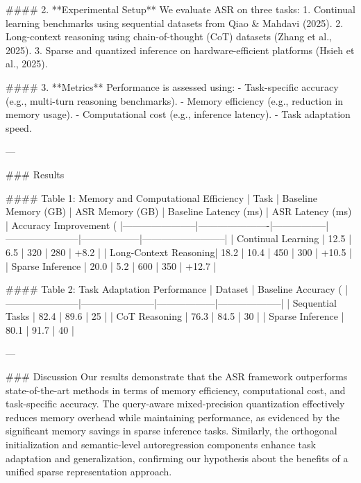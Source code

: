 #### 2. **Experimental Setup**  
We evaluate ASR on three tasks:  
1. Continual learning benchmarks using sequential datasets from Qiao & Mahdavi (2025).  
2. Long-context reasoning using chain-of-thought (CoT) datasets (Zhang et al., 2025).  
3. Sparse and quantized inference on hardware-efficient platforms (Hsieh et al., 2025).

#### 3. **Metrics**  
Performance is assessed using:  
- Task-specific accuracy (e.g., multi-turn reasoning benchmarks).  
- Memory efficiency (e.g., reduction in memory usage).  
- Computational cost (e.g., inference latency).  
- Task adaptation speed.

---

### Results  

#### Table 1: Memory and Computational Efficiency  
| Task                  | Baseline Memory (GB) | ASR Memory (GB) | Baseline Latency (ms) | ASR Latency (ms) | Accuracy Improvement (%
|-----------------------|----------------------|-----------------|-----------------------|------------------|--------------------------|
| Continual Learning    | 12.5                | 6.5             | 320                   | 280              | +8.2                    |
| Long-Context Reasoning| 18.2                | 10.4            | 450                   | 300              | +10.5                   |
| Sparse Inference      | 20.0                | 5.2             | 600                   | 350              | +12.7                   |

#### Table 2: Task Adaptation Performance  
| Dataset               | Baseline Accuracy (%
|-----------------------|-----------------------|------------------|--------------------|
| Sequential Tasks      | 82.4                 | 89.6             | 25                 |
| CoT Reasoning         | 76.3                 | 84.5             | 30                 |
| Sparse Inference      | 80.1                 | 91.7             | 40                 |

---

### Discussion  
Our results demonstrate that the ASR framework outperforms state-of-the-art methods in terms of memory efficiency, computational cost, and task-specific accuracy. The query-aware mixed-precision quantization effectively reduces memory overhead while maintaining performance, as evidenced by the significant memory savings in sparse inference tasks. Similarly, the orthogonal initialization and semantic-level autoregression components enhance task adaptation and generalization, confirming our hypothesis about the benefits of a unified sparse representation approach.

